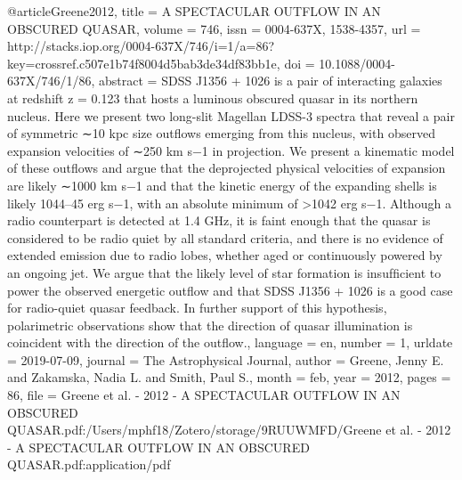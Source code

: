 {@article{Greene2012,
	title = {A {SPECTACULAR} {OUTFLOW} {IN} {AN} {OBSCURED} {QUASAR}},
	volume = {746},
	issn = {0004-637X, 1538-4357},
	url = {http://stacks.iop.org/0004-637X/746/i=1/a=86?key=crossref.c507e1b74f8004d5bab3de34df83bb1e},
	doi = {10.1088/0004-637X/746/1/86},
	abstract = {SDSS J1356 + 1026 is a pair of interacting galaxies at redshift z = 0.123 that hosts a luminous obscured quasar in its northern nucleus. Here we present two long-slit Magellan LDSS-3 spectra that reveal a pair of symmetric ∼10 kpc size outﬂows emerging from this nucleus, with observed expansion velocities of ∼250 km s−1 in projection. We present a kinematic model of these outﬂows and argue that the deprojected physical velocities of expansion are likely ∼1000 km s−1 and that the kinetic energy of the expanding shells is likely 1044–45 erg s−1, with an absolute minimum of {\textgreater}1042 erg s−1. Although a radio counterpart is detected at 1.4 GHz, it is faint enough that the quasar is considered to be radio quiet by all standard criteria, and there is no evidence of extended emission due to radio lobes, whether aged or continuously powered by an ongoing jet. We argue that the likely level of star formation is insufﬁcient to power the observed energetic outﬂow and that SDSS J1356 + 1026 is a good case for radio-quiet quasar feedback. In further support of this hypothesis, polarimetric observations show that the direction of quasar illumination is coincident with the direction of the outﬂow.},
	language = {en},
	number = {1},
	urldate = {2019-07-09},
	journal = {The Astrophysical Journal},
	author = {Greene, Jenny E. and Zakamska, Nadia L. and Smith, Paul S.},
	month = feb,
	year = {2012},
	pages = {86},
	file = {Greene et al. - 2012 - A SPECTACULAR OUTFLOW IN AN OBSCURED QUASAR.pdf:/Users/mphf18/Zotero/storage/9RUUWMFD/Greene et al. - 2012 - A SPECTACULAR OUTFLOW IN AN OBSCURED QUASAR.pdf:application/pdf}
}

}
